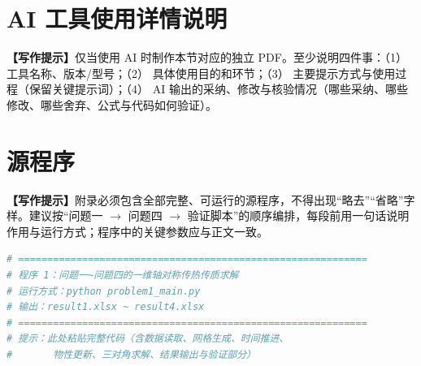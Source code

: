 \documentclass[12pt,a4paper]{article}
\newcommand{\prompt}[1]{\par\noindent\textbf{【写作提示】}#1\par}      %
\begin{document}
\section{AI 工具使用详情说明}

\prompt{仅当使用 AI 时制作本节对应的独立 PDF。至少说明四件事：（1） 工具名称、版本/型号；（2） 具体使用目的和环节；（3） 主要提示方式与使用过程（保留关键提示词）；（4） AI 输出的采纳、修改与核验情况（哪些采纳、哪些修改、哪些舍弃、公式与代码如何验证）。}

\section{源程序}

\prompt{附录必须包含全部完整、可运行的源程序，不得出现“略去”“省略”字样。建议按“问题一 $\rightarrow$ 问题四 $\rightarrow$ 验证脚本”的顺序编排，每段前用一句话说明作用与运行方式；程序中的关键参数应与正文一致。}

\begin{lstlisting}[language=Python,caption={程序清单占位（请替换为完整代码）}]
# ============================================================
# 程序 1：问题一~问题四的一维轴对称传热传质求解
# 运行方式：python problem1_main.py
# 输出：result1.xlsx ~ result4.xlsx
# ============================================================
# 提示：此处粘贴完整代码（含数据读取、网格生成、时间推进、
#       物性更新、三对角求解、结果输出与验证部分）
\end{lstlisting}
\end{document}
